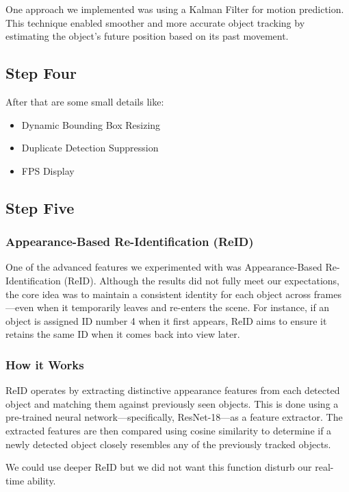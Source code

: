 \documentclass[a4paper,12pt]{article}
\begin{document}
One approach we implemented was using a Kalman Filter for motion prediction. 
This technique enabled smoother and more accurate object tracking by estimating the object's future position based on its past movement.

\subsection{Step Four}

After that are some small details like:

\begin{itemize}
    \item Dynamic Bounding Box Resizing
    \item Duplicate Detection Suppression
    \item FPS Display
\end{itemize}

\subsection{Step Five}

\subsubsection{Appearance-Based Re-Identification (ReID)}

One of the advanced features we experimented with was Appearance-Based Re-Identification (ReID). 
Although the results did not fully meet our expectations, the core idea was to maintain a consistent identity for each object across frames—even when it temporarily leaves and re-enters the scene. 
For instance, if an object is assigned ID number 4 when it first appears, ReID aims to ensure it retains the same ID when it comes back into view later.

\subsubsection{How it Works}

ReID operates by extracting distinctive appearance features from each detected object and matching them against previously seen objects. 
This is done using a pre-trained neural network—specifically, ResNet-18—as a feature extractor. The extracted features are then compared using cosine similarity to determine if a newly detected object closely resembles any of the previously tracked objects.

We could use deeper ReID but we did not want this function disturb our real-time ability.
\end{document}
